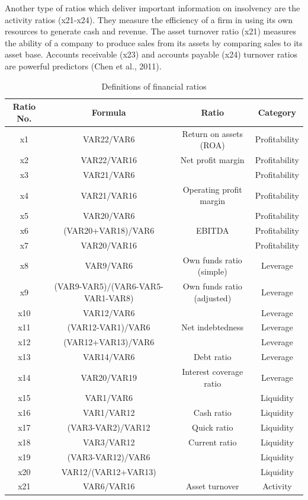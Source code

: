 \documentclass{article}
\begin{document}
 Another type of ratios which deliver important information on insolvency are the activity ratios (x21-x24). They measure the efficiency of a firm in using its own resources to generate cash and revenue. The asset turnover ratio (x21) measures the ability of a company to produce sales from its assets by comparing sales to its asset base. Accounts receivable (x23) and accounts payable (x24) turnover ratios are powerful predictors 
(Chen et al., 2011).  

\begin{table}[t]
\begin{center}
\caption{Definitions of financial ratios}
\scriptsize
\begin{tabular}{cccc} 
\hline\hline
Ratio No. & Formula & Ratio & Category\\ 
\hline
x1 & VAR22/VAR6 & Return on assets (ROA) & Profitability\\
x2 & VAR22/VAR16 & Net profit margin & Profitability\\
x3 & VAR21/VAR6 & & Profitability\\
x4 & VAR21/VAR16 & Operating profit margin & Profitability\\
x5 & VAR20/VAR6 & & Profitability\\
x6 & (VAR20+VAR18)/VAR6 & EBITDA & Profitability\\ 
x7 & VAR20/VAR16 & & Profitability\\
x8 & VAR9/VAR6 & Own funds ratio (simple) & Leverage\\
x9 & (VAR9-VAR5)/(VAR6-VAR5-VAR1-VAR8) & Own funds ratio (adjusted) & Leverage\\
x10 & VAR12/VAR6 & & Leverage\\
x11 & (VAR12-VAR1)/VAR6 & Net indebtedness & Leverage\\
x12 & (VAR12+VAR13)/VAR6 & & Leverage\\
x13 & VAR14/VAR6 & Debt ratio & Leverage\\
x14 & VAR20/VAR19 & Interest coverage ratio & Leverage\\  
x15 & VAR1/VAR6 & & Liquidity\\
x16 & VAR1/VAR12 & Cash ratio & Liquidity\\
x17 & (VAR3-VAR2)/VAR12 & Quick ratio & Liquidity\\
x18 & VAR3/VAR12 & Current ratio & Liquidity\\ 
x19 & (VAR3-VAR12)/VAR6 & & Liquidity\\
x20 & VAR12/(VAR12+VAR13) & & Liquidity\\
x21 & VAR6/VAR16 & Asset turnover & Activity\\

\end{tabular}
\end{center}
\end{table}
\end{document}
